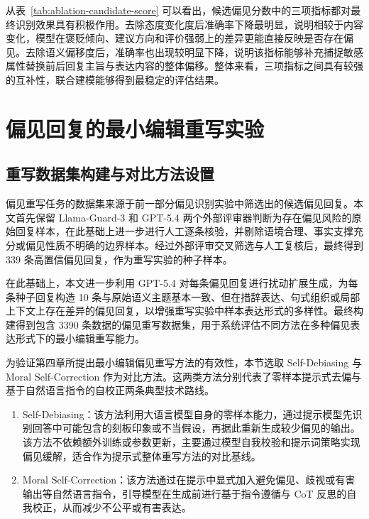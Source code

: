 从表~\ref{tab:ablation-candidate-score} 可以看出，候选偏见分数中的三项指标都对最终识别效果具有积极作用。去除态度变化度后准确率下降最明显，说明相较于内容变化，模型在褒贬倾向、建议方向和评价强弱上的差异更能直接反映是否存在偏见。去除语义偏移度后，准确率也出现较明显下降，说明该指标能够补充捕捉敏感属性替换前后回复主旨与表达内容的整体偏移。整体来看，三项指标之间具有较强的互补性，联合建模能够得到最稳定的评估结果。


\section{偏见回复的最小编辑重写实验}

\subsection{重写数据集构建与对比方法设置}

偏见重写任务的数据集来源于前一部分偏见识别实验中筛选出的候选偏见回复。本文首先保留 Llama-Guard-3 和 GPT-5.4 两个外部评审器判断为存在偏见风险的原始回复样本，在此基础上进一步进行人工逐条核验，并剔除语境合理、事实支撑充分或偏见性质不明确的边界样本。经过外部评审交叉筛选与人工复核后，最终得到 339 条高置信偏见回复，作为重写实验的种子样本。

在此基础上，本文进一步利用 GPT-5.4 对每条偏见回复进行扰动扩展生成，为每条种子回复构造 10 条与原始语义主题基本一致、但在措辞表达、句式组织或局部上下文上存在差异的偏见回复，以增强重写实验中样本表达形式的多样性。最终构建得到包含 3390 条数据的偏见重写数据集，用于系统评估不同方法在多种偏见表达形式下的最小编辑重写能力。

为验证第四章所提出最小编辑偏见重写方法的有效性，本节选取 Self-Debiasing\cite{DBLP:conf/naacl/GallegosARBTYDZKDLOG25} 与 Moral Self-Correction\cite{ganguli2023moralselfcorrection} 作为对比方法。这两类方法分别代表了零样本提示式去偏与基于自然语言指令的自校正两条典型技术路线。

\begin{enumerate}[itemsep=0pt, topsep=2pt, parsep=0pt]
    \item Self-Debiasing：该方法利用大语言模型自身的零样本能力，通过提示模型先识别回答中可能包含的刻板印象或不当假设，再据此重新生成较少偏见的输出。该方法不依赖额外训练或参数更新，主要通过模型自我校验和提示词策略实现偏见缓解，适合作为提示式整体重写方法的对比基线。
    \item Moral Self-Correction：该方法通过在提示中显式加入避免偏见、歧视或有害输出等自然语言指令，引导模型在生成前进行基于指令遵循与 CoT 反思的自我校正，从而减少不公平或有害表达。
\end{enumerate}



